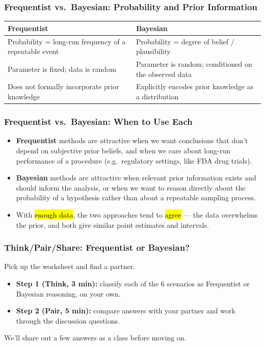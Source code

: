 \documentclass[slidestop,compress,mathserif]{beamer}
\begin{document}
\begin{frame}
    \frametitle{Frequentist vs.\ Bayesian: Probability and Prior Information}
    \renewcommand{\arraystretch}{1.3}
    \begin{tabular}{>{\raggedright\arraybackslash}p{4.7cm} >{\raggedright\arraybackslash}p{4.7cm}}
    \toprule
    \textbf{Frequentist} & \textbf{Bayesian} \\
    \midrule
    Probability = long-run frequency of a repeatable event & Probability = degree of belief / plausibility \\
    Parameter is fixed; data is random & Parameter is random; conditioned on the observed data \\
    Does not formally incorporate prior knowledge & Explicitly encodes prior knowledge as a distribution \\
    \bottomrule
    \end{tabular}
\end{frame}

\begin{frame}
    \frametitle{Frequentist vs.\ Bayesian: When to Use Each}
    \begin{itemize}
        \item \textbf{Frequentist} methods are attractive when we want conclusions that don't depend on subjective prior beliefs, and when we care about long-run performance of a procedure (e.g.\ regulatory settings, like FDA drug trials).
        \pause
        \item \textbf{Bayesian} methods are attractive when relevant prior information exists and should inform the analysis, or when we want to reason directly about the probability of a hypothesis rather than about a repeatable sampling process.
        \pause
        \item With \hl{enough data}, the two approaches tend to \hl{agree} --- the data overwhelms the prior, and both give similar point estimates and intervals.
    \end{itemize}
\end{frame}


\begin{frame}
    \frametitle{Think/Pair/Share: Frequentist or Bayesian?}
    Pick up the worksheet and find a partner.
    \medskip
    \begin{itemize}
        \item \textbf{Step 1 (Think, 3 min):} classify each of the 6 scenarios as Frequentist or Bayesian reasoning, on your own.
        \item \textbf{Step 2 (Pair, 5 min):} compare answers with your partner and work through the discussion questions.
    \end{itemize}
    \medskip
    We'll share out a few answers as a class before moving on.
\end{frame}
\end{document}
